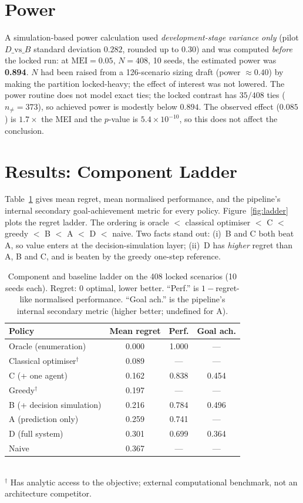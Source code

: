 \documentclass[conference]{IEEEtran}
\begin{document}
\section{Power}\label{sec:power}
A simulation-based power calculation used \emph{development-stage variance only}
(pilot $D\text{\_vs\_}B$ standard deviation $0.282$, rounded up to $0.30$) and
was computed \emph{before} the locked run: at $\mathrm{MEI}=0.05$, $N=408$,
10 seeds, the estimated power was \textbf{0.894}. $N$ had been raised from a
126-scenario sizing draft (power $\approx0.40$) by making the partition
locked-heavy; the effect of interest was not lowered. The power routine does not
model exact ties; the locked contrast has $35/408$ ties ($n_{\neq}=373$), so
achieved power is modestly below $0.894$. The observed effect ($0.085$) is
$1.7\times$ the MEI and the $p$-value is $5.4\times10^{-10}$, so this does not
affect the conclusion.

\section{Results: Component Ladder}\label{sec:ladder}
Table~\ref{tab:ladder} gives mean regret, mean normalised performance, and the
pipeline's internal secondary goal-achievement metric for every policy.
Figure~\ref{fig:ladder} plots the regret ladder. The ordering is
oracle $<$ classical optimiser $<$ C $<$ greedy $<$ B $<$ A $<$ D $<$ naive.
Two facts stand out: (i)~B and C both beat A, so value enters at the
decision-simulation layer; (ii)~D has \emph{higher} regret than A, B and C, and
is beaten by the greedy one-step reference.

\begin{table}[!t]
\caption{Component and baseline ladder on the 408 locked scenarios
(10 seeds each). Regret: $0$ optimal, lower better. ``Perf.'' is
$1-$regret-like normalised performance. ``Goal ach.'' is the pipeline's internal
secondary metric (higher better; undefined for A).}
\label{tab:ladder}
\centering
\begin{tabular}{lccc}
\toprule
Policy & Mean regret & Perf. & Goal ach. \\
\midrule
Oracle (enumeration)      & 0.000 & 1.000 & --- \\
Classical optimiser$^\dagger$ & 0.089 & --- & --- \\
C (+ one agent)           & 0.162 & 0.838 & 0.454 \\
Greedy$^\dagger$          & 0.197 & --- & --- \\
B (+ decision simulation) & 0.216 & 0.784 & 0.496 \\
A (prediction only)       & 0.259 & 0.741 & --- \\
D (full system)           & 0.301 & 0.699 & 0.364 \\
Naive                     & 0.367 & --- & --- \\
\bottomrule
\end{tabular}\\[2pt]
{\footnotesize $^\dagger$ Has analytic access to the objective; external
computational benchmark, not an architecture competitor.}
\end{table}
\end{document}
